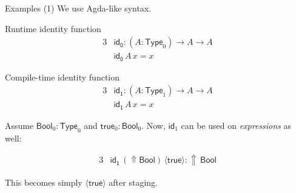 \documentclass[dvipsnames]{beamer}
\newcommand{\ms}[1]{\mathsf{#1}}
\newcommand{\id}{\mathsf{id}}
\newcommand{\Type}{\mathsf{Type}}
\newcommand{\Bool}{\ms{Bool}}
\newcommand{\true}{\ms{true}}
\newcommand{\Lift}{{\Uparrow}}
\newcommand{\qut}[1]{\langle #1\rangle}
\begin{document}
\begin{frame}{Examples (1)}
 We use Agda-like syntax.


\begin{exampleblock}{Runtime identity function}
  \vspace{-1.2em}
  \begin{alignat*}{3}
    & \ms{id_0} : (A : \Type_0) \to A \to A\\
    & \ms{id_0}\,A\,x = x
  \end{alignat*}
\end{exampleblock}
\pause

\begin{exampleblock}{Compile-time identity function}
  \vspace{-1.2em}
  \begin{alignat*}{3}
    & \ms{id_1} : (A : \Type_1) \to A \to A\\
    & \ms{id_1}\,A\,x = x
  \end{alignat*}
\end{exampleblock}
\pause

Assume $\Bool_0 : \Type_0$ and $\true_0 : \Bool_0$. Now, $\id_1$ can be used on
\emph{expressions} as well:

\begin{exampleblock}{}
  \vspace{-1.2em}
  \begin{alignat*}{3}
    & \ms{id_1}\,(\Lift \Bool)\,\qut{\true} : \Lift\,\Bool
  \end{alignat*}
\end{exampleblock}

This becomes simply $\qut{\true}$ after staging.

\end{frame}
\end{document}
